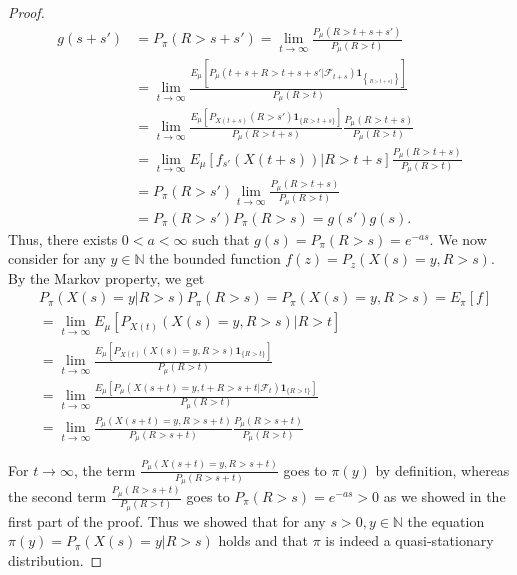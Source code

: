 \documentclass[12pt,a4paper]{scrartcl}
\numberwithin{equation}{section}
\newcommand{\N}{\mathbb{N}} %
\begin{document}
\begin{proof}
\begin{align*}
g\left(s + s' \right) &= P_{\pi}\left( R > s+s'\right) = \lim_{t \to \infty} \frac{P_{\mu}\left(R > t + s + s' \right)}{P_{\mu}\left(R > t \right)} \\
&= \lim_{t \to \infty} \frac{E_{\mu}\left[P_{\mu}\left(t+s+R > t+s+s' | \mathcal{F}_{t+s} \right) \textbf{1}_{\brace R > t +s \rbrace} \right]}{P_{\mu}\left(R > t \right)} \\
&= \lim_{t \to \infty} \frac{E_{\mu}\left[P_{X\left(t+s\right)}\left( R > s'\right) \textbf{1}_{\lbrace R > t+s \rbrace} \right]}{P_{\mu}\left(R > t+s \right)} \frac{P_{\mu}\left(R > t+s\right)}{P_{\mu}\left(R > t\right)} \\
&= \lim_{t \to \infty} E_{\mu}\left[f_{s'}\left(X\left(t+s\right) \right) | R > t+s \right] \frac{P_{\mu}\left(R > t+s\right)}{P_{\mu}\left(R > t\right)} \\
&= P_{\pi}\left( R > s' \right) \lim_{t \to \infty} \frac{P_{\mu}\left(R > t+s\right)}{P_{\mu}\left(R > t\right)} \\
&= P_{\pi}\left( R > s'\right) P_{\pi}\left(R > s\right) = g\left(s'\right) g\left(s\right).
\end{align*}
Thus, there exists $0 < a < \infty$ such that $g\left(s\right) = P_{\pi}\left( R > s\right) = e^{-as}.$ We now consider for any $y \in \N$ the bounded function $f\left(z\right) = P_z\left(X\left(s\right) = y, R > s \right). $ By the Markov property, we get
\begin{align*}
&P_{\pi}\left(X\left(s\right) = y | R > s \right) P_{\pi}\left(R > s\right) = P_{\pi}\left(X\left(s\right) = y, R > s \right) = E_{\pi}\left[f\right] \\
&= \lim_{t \to \infty} E_{\mu}\left[ P_{X\left(t\right)}\left(X\left(s\right) = y, R > s \right) | R > t \right] \\
&= \lim_{t \to \infty} \frac{E_{\mu}\left[P_{X\left(t\right)} \left(X\left(s\right) = y, R > s \right) \textbf{1}_{\lbrace R > t\rbrace}\right]}{P_{\mu}\left(R > t\right) } \\
&= \lim_{t \to \infty} \frac{E_{\mu}\left[ P_{\mu}\left(X\left(s+t\right) = y, t + R > s + t | \mathcal{F}_t \right) \textbf{1}_{\lbrace R > t\rbrace} \right] }{P_{\mu}\left(R > t \right)} \\
&= \lim_{t \to \infty} \frac{P_{\mu}\left(X\left(s+t\right) = y, R > s+t \right)}{P_{\mu}\left(R > s+t\right) } \frac{P_{\mu}\left(R > s+t\right)}{P_{\mu}\left(R > t\right)}
\end{align*}
 
For $t \to \infty$, the term $\frac{P_{\mu}\left(X\left(s+t\right) = y, R > s+t \right)}{P_{\mu}\left(R > s+t\right) }$ goes to $\pi\left(y\right)$ by definition, whereas the second term $ \frac{P_{\mu}\left(R > s+t\right)}{P_{\mu}\left(R > t\right)} $ goes to $P_{\pi}\left(R > s\right) = e^{-a s} > 0 $ as we showed in the first part of the proof. 
Thus we showed that for any $s >0, y \in \N$ the equation $ \pi\left(y\right) = P_{\pi}\left( X\left(s\right) = y | R > s\right)$ holds and that $\pi$ is indeed a quasi-stationary distribution.

\end{proof}
\end{document}
